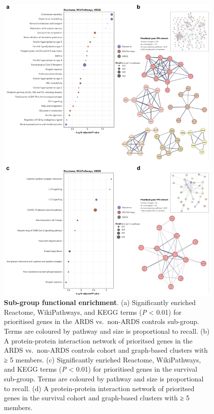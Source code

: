 \documentclass[
  11,
  a4paper,
]{article}
\begin{document}
\begin{figure}

{\centering \includegraphics{./img/Figure_4.png}

}

\caption{\label{fig-fig4}\textbf{Sub-group functional enrichment}. (a)
Significantly enriched Reactome, WikiPathways, and KEGG terms (\emph{P}
\textless{} 0.01) for prioritised genes in the ARDS vs.~non-ARDS
controls sub-group. Terms are coloured by pathway and size is
proportional to recall. (b) A protein-protein interaction network of
prioritsed genes in the ARDS vs.~non-ARDS controls cohort and
graph-based clusters with ≥ 5 members. (c) Significantly enriched
Reactome, WikiPathways, and KEGG terms (\emph{P} \textless{} 0.01) for
prioritised genes in the survival sub-group. Terms are coloured by
pathway and size is proportional to recall. (d) A protein-protein
interaction network of prioritsed genes in the survival cohort and
graph-based clusters with ≥ 5 members.}

\end{figure}
\end{document}
